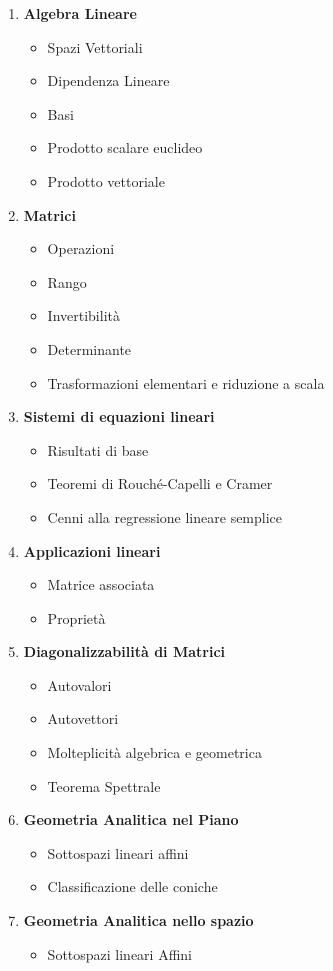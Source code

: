 \begin{enumerate}
	\item \textbf{Algebra Lineare}
	\begin{itemize}
		\item Spazi Vettoriali
		\item Dipendenza Lineare
		\item Basi
		\item Prodotto scalare euclideo
		\item Prodotto vettoriale
	\end{itemize}
	\item \textbf{Matrici}
	\begin{itemize}	
		\item Operazioni
		\item Rango
		\item Invertibilità
		\item Determinante
		\item Trasformazioni elementari e riduzione a scala 
	\end{itemize}
	\item \textbf{Sistemi di equazioni lineari}
	\begin{itemize}
		\item Risultati di base
		\item Teoremi di Rouché-Capelli e Cramer
		\item Cenni alla regressione lineare semplice
	\end{itemize}
	\item \textbf{Applicazioni lineari}
	\begin{itemize}
		\item Matrice associata
		\item Proprietà
	\end{itemize}
	\item \textbf{Diagonalizzabilità di Matrici}
	\begin{itemize}
		\item Autovalori
		\item Autovettori
		\item Molteplicità algebrica e geometrica
		\item Teorema Spettrale
	\end{itemize}
	\item \textbf{Geometria Analitica nel Piano}
	\begin{itemize}
		\item Sottospazi lineari affini
		\item Classificazione delle coniche
	\end{itemize}
	\item \textbf{Geometria Analitica nello spazio}
	\begin{itemize}
		\item Sottospazi lineari Affini
	\end{itemize}
	
\end{enumerate}


